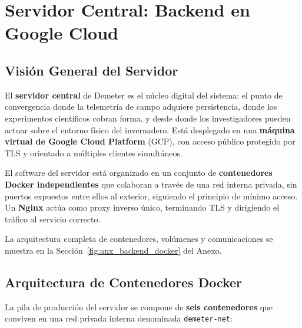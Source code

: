\chapter{Servidor Central: Backend en Google Cloud}
\label{sec:backend}

\section{Visión General del Servidor}

El \textbf{servidor central} de Demeter es el núcleo digital del sistema: el punto de convergencia
donde la telemetría de campo adquiere persistencia, donde los experimentos científicos cobran forma, 
y desde donde los investigadores pueden actuar sobre el entorno físico del invernadero. Está 
desplegado en una \textbf{máquina virtual de Google Cloud Platform} (GCP), con acceso público 
protegido por TLS y orientado a múltiples clientes simultáneos.

El software del servidor está organizado en un conjunto de \textbf{contenedores Docker independientes} 
que colaboran a través de una red interna privada, sin puertos expuestos entre ellos al exterior, 
siguiendo el principio de mínimo acceso. Un \textbf{Nginx} actúa como proxy inverso único, 
terminando TLS y dirigiendo el tráfico al servicio correcto.

La arquitectura completa de contenedores, volúmenes y comunicaciones se muestra en la 
Sección~\ref{fig:anx_backend_docker} del Anexo.

\section{Arquitectura de Contenedores Docker}

La pila de producción del servidor se compone de \textbf{seis contenedores} que conviven en una 
red privada interna denominada \texttt{demeter-net}:

